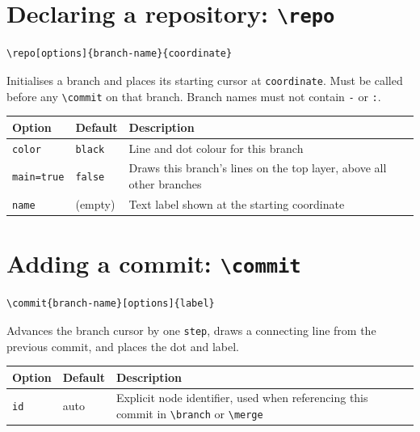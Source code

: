 \documentclass{article}
\newcommand{\cmd}[1]{\texttt{\textbackslash#1}}
\newcommand{\opt}[1]{\texttt{#1}}
\begin{document}
    \section{Declaring a repository: \cmd{repo}}

        \begin{verbatim}
\repo[options]{branch-name}{coordinate}
        \end{verbatim}

        Initialises a branch and places its starting cursor at \texttt{coordinate}.
        Must be called before any \cmd{commit} on that branch.
        Branch names must not contain \texttt{-} or \texttt{:}.

        \bigskip
        \begin{tabularx}{\textwidth}{llX}
        \hline
        \textbf{Option} & \textbf{Default} & \textbf{Description} \\
        \hline
        \opt{color}     & \opt{black}  & Line and dot colour for this branch \\
        \opt{main=true} & \opt{false}  & Draws this branch's lines on the top layer,
                                        above all other branches \\
        \opt{name}      & (empty)      & Text label shown at the starting coordinate \\
        \hline
        \end{tabularx}

    \section{Adding a commit: \cmd{commit}}

        \begin{verbatim}
\commit{branch-name}[options]{label}
        \end{verbatim}

        Advances the branch cursor by one \opt{step}, draws a connecting line
        from the previous commit, and places the dot and label.

        \bigskip
        \begin{tabularx}{\textwidth}{llX}
            \hline
            \textbf{Option} & \textbf{Default} & \textbf{Description} \\
            \hline
            \opt{id} & auto & Explicit node identifier, used when referencing this commit
                            in \cmd{branch} or \cmd{merge} \\
            \hline
        \end{tabularx}
\end{document}

